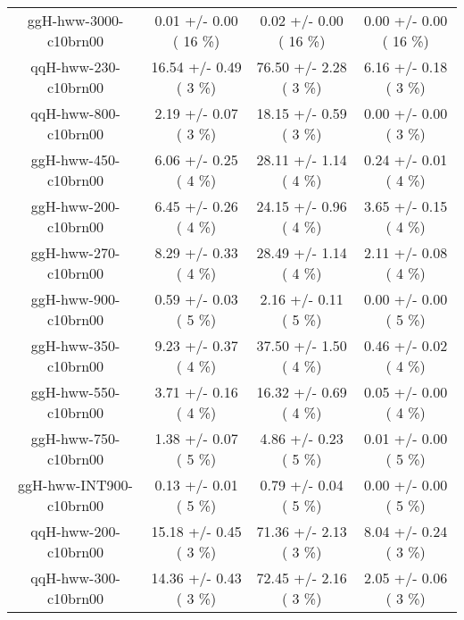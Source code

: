 \begin{table}[h!]
\begin{center}
{\begin{tabular}{
c| c | c | c | }
 ggH-hww-3000-c10brn00   &       0.01 +/-       0.00 (        16 \%)   &       0.02 +/-       0.00 (        16 \%)   &       0.00 +/-       0.00 (        16 \%)  \\
 qqH-hww-230-c10brn00   &      16.54 +/-       0.49 (         3 \%)   &      76.50 +/-       2.28 (         3 \%)   &       6.16 +/-       0.18 (         3 \%)  \\
 qqH-hww-800-c10brn00   &       2.19 +/-       0.07 (         3 \%)   &      18.15 +/-       0.59 (         3 \%)   &       0.00 +/-       0.00 (         3 \%)  \\
 ggH-hww-450-c10brn00   &       6.06 +/-       0.25 (         4 \%)   &      28.11 +/-       1.14 (         4 \%)   &       0.24 +/-       0.01 (         4 \%)  \\
 ggH-hww-200-c10brn00   &       6.45 +/-       0.26 (         4 \%)   &      24.15 +/-       0.96 (         4 \%)   &       3.65 +/-       0.15 (         4 \%)  \\
 ggH-hww-270-c10brn00   &       8.29 +/-       0.33 (         4 \%)   &      28.49 +/-       1.14 (         4 \%)   &       2.11 +/-       0.08 (         4 \%)  \\
 ggH-hww-900-c10brn00   &       0.59 +/-       0.03 (         5 \%)   &       2.16 +/-       0.11 (         5 \%)   &       0.00 +/-       0.00 (         5 \%)  \\
 ggH-hww-350-c10brn00   &       9.23 +/-       0.37 (         4 \%)   &      37.50 +/-       1.50 (         4 \%)   &       0.46 +/-       0.02 (         4 \%)  \\
 ggH-hww-550-c10brn00   &       3.71 +/-       0.16 (         4 \%)   &      16.32 +/-       0.69 (         4 \%)   &       0.05 +/-       0.00 (         4 \%)  \\
 ggH-hww-750-c10brn00   &       1.38 +/-       0.07 (         5 \%)   &       4.86 +/-       0.23 (         5 \%)   &       0.01 +/-       0.00 (         5 \%)  \\
 ggH-hww-INT900-c10brn00   &       0.13 +/-       0.01 (         5 \%)   &       0.79 +/-       0.04 (         5 \%)   &       0.00 +/-       0.00 (         5 \%)  \\
 qqH-hww-200-c10brn00   &      15.18 +/-       0.45 (         3 \%)   &      71.36 +/-       2.13 (         3 \%)   &       8.04 +/-       0.24 (         3 \%)  \\
 qqH-hww-300-c10brn00   &      14.36 +/-       0.43 (         3 \%)   &      72.45 +/-       2.16 (         3 \%)   &       2.05 +/-       0.06 (         3 \%)  \\

\end{tabular}}
\end{center}
\end{table}
